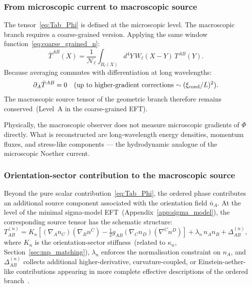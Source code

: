 \documentclass[11pt,a4paper]{article}
\numberwithin{equation}{section}
\begin{document}
\subsubsection*{From microscopic current to macroscopic source}

The tensor~\eqref{eq:Tab_Phi} is defined at the microscopic level.
The macroscopic branch requires a coarse-grained version.
Applying the same window function~\eqref{eq:coarse_grained_n}:
\begin{equation}
  \label{eq:Tab_coarse}
  \bar{T}^{AB}(X)
  = \frac{1}{\mathcal{N}_\ell}
    \int_{B_\ell(X)}d^4Y\,W_\ell(X-Y)\,T^{AB}(Y).
\end{equation}
Because averaging commutes with differentiation at long wavelengths:
\begin{equation}
  \label{eq:Tab_coarse_cons}
  \partial_A\bar{T}^{AB} = 0
  \quad\text{(up to higher-gradient corrections
  $\sim(\xi_{\rm cond}/L)^2$)}.
\end{equation}
The macroscopic source tensor of the geometric branch therefore remains
conserved~(Level~A in the coarse-grained EFT).

Physically, the macroscopic observer does not measure microscopic
gradients of $\Phi$ directly.
What is reconstructed are long-wavelength energy densities, momentum
fluxes, and stress-like components --- the hydrodynamic analogue of
the microscopic Noether current.

\subsubsection*{Orientation-sector contribution to the macroscopic source}

Beyond the pure scalar contribution~\eqref{eq:Tab_Phi}, the ordered
phase contributes an additional source component associated with the
orientation field $\bar{n}_A$.
At the level of the minimal sigma-model EFT~(Appendix~\ref{app:sigma_model}),
the corresponding source tensor has the schematic structure:
\begin{equation}
  \label{eq:EMT_n}
  T_{AB}^{(n)}
  = K_n\!\left[
    (\nabla_A n_C)(\nabla_B n^C)
    - \tfrac{1}{2}g_{AB}(\nabla_C n_D)(\nabla^C n^D)
  \right]
  + \lambda_n\,n_A n_B
  + \Delta_{AB}^{(n)},
\end{equation}
where $K_n$ is the orientation-sector stiffness~(related to $\kappa_n$,
Section~\ref{sec:mp_matching}), $\lambda_n$ enforces the normalisation
constraint on $n_A$, and $\Delta_{AB}^{(n)}$ collects additional
higher-derivative, curvature-coupled, or Einstein-aether-like
contributions appearing in more complete effective descriptions of
the ordered branch~\cite{Jacobson2004}.
\end{document}
